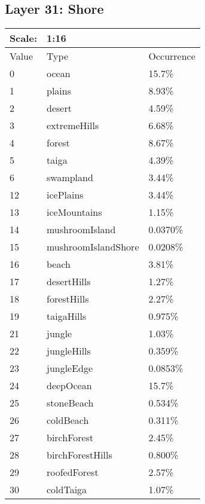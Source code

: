 \documentclass{article}
\begin{document}
	\subsection{Layer 31: Shore}
	\begin{tabular}{|l|l|l|}\hline
		Scale: & \multicolumn{2}{|l|}{1:16} \\\hline\hline
		Value  & Type                & Occurrence \\\hline
		0      & ocean               & 15.7\%\\\hline
		1      & plains              & 8.93\%\\\hline
		2      & desert              & 4.59\%\\\hline
		3      & extremeHills        & 6.68\%\\\hline
		4      & forest              & 8.67\%\\\hline
		5      & taiga               & 4.39\%\\\hline
		6      & swampland           & 3.44\%\\\hline
		12     & icePlains           & 3.44\%\\\hline
		13     & iceMountains        & 1.15\%\\\hline
		14     & mushroomIsland      & 0.0370\%\\\hline
		15     & mushroomIslandShore & 0.0208\%\\\hline
		16     & beach               & 3.81\%\\\hline
		17     & desertHills         & 1.27\%\\\hline
		18     & forestHills         & 2.27\%\\\hline
		19     & taigaHills          & 0.975\%\\\hline
		21     & jungle              & 1.03\%\\\hline
		22     & jungleHills         & 0.359\%\\\hline
		23     & jungleEdge          & 0.0853\%\\\hline
		24     & deepOcean           & 15.7\%\\\hline
		25     & stoneBeach          & 0.534\%\\\hline
		26     & coldBeach           & 0.311\%\\\hline
		27     & birchForest         & 2.45\%\\\hline
		28     & birchForestHills    & 0.800\%\\\hline
		29     & roofedForest        & 2.57\%\\\hline
		30     & coldTaiga           & 1.07\%\\\hline

\end{tabular}
\end{document}
